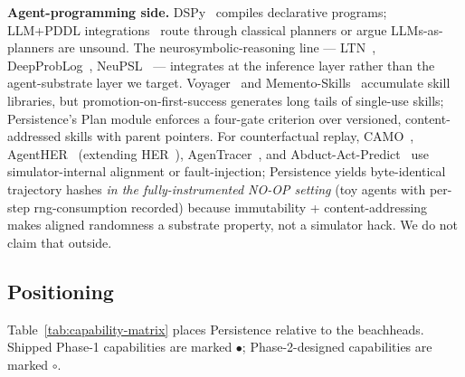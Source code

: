 \documentclass[anon]{nesy2026}   %
\begin{document}
\textbf{Agent-programming side.} DSPy~\citep{khattab2023dspy} compiles declarative programs; LLM+PDDL integrations~\citep{liu2023llmp,valmeekam2023planbench,kambhampati2024canllm} route through classical planners or argue LLMs-as-planners are unsound. The neurosymbolic-reasoning line --- LTN~\citep{badreddine2022ltn}, DeepProbLog~\citep{manhaeve2018deepproblog}, NeuPSL~\citep{pryor2023neupsl} --- integrates at the inference layer rather than the agent-substrate layer we target. Voyager~\citep{wang2023voyager} and Memento-Skills~\citep{memento2026skills} accumulate skill libraries, but promotion-on-first-success generates long tails of single-use skills; Persistence's Plan module enforces a four-gate criterion over versioned, content-addressed skills with parent pointers. For counterfactual replay, CAMO~\citep{anon2026camo}, AgentHER~\citep{anon2026agenther} (extending HER~\citep{andrychowicz2017her}), AgenTracer~\citep{anon2025agentracer}, and Abduct-Act-Predict~\citep{anon2025aap} use simulator-internal alignment or fault-injection; Persistence yields byte-identical trajectory hashes \emph{in the fully-instrumented NO-OP setting} (toy agents with per-step rng-consumption recorded) because immutability + content-addressing makes aligned randomness a substrate property, not a simulator hack. We do not claim that outside.

\subsection{Positioning}\label{sec:positioning}

Table~\ref{tab:capability-matrix} places Persistence relative to the beachheads. Shipped Phase-1 capabilities are marked $\bullet$; Phase-2-designed capabilities are marked $\circ$.
\end{document}
